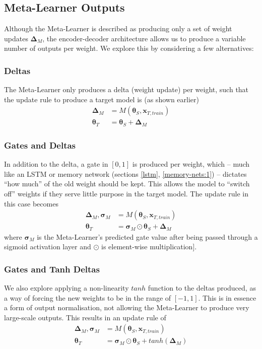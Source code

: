 \documentclass{report}
\begin{document}
\subsection{Meta-Learner Outputs}
Although the Meta-Learner is described as producing only a set of weight updates $\bm{\Delta}_M$, the encoder-decoder architecture allows us to produce a variable number of outputs per weight. We explore this by considering a few alternatives:

\subsubsection{Deltas}
The Meta-Learner only produces a delta (weight update) per weight, such that the update rule to produce a target model is (as shown earlier)
\begin{align}
\bm{\Delta}_M &= M(\bm{\theta}_S, \bm{x}_{T,train}) \\
\bm{\theta}_T &= \bm{\theta}_S + \bm{\Delta}_M \label{eqn-delta-updates}
\end{align}


\subsubsection{Gates and Deltas}
In addition to the delta, a gate in $[0, 1]$ is produced per weight, which -- much like an LSTM or memory network (sections \ref{lstm}, \ref{memory-nets:1}) -- dictates ``how much'' of the old weight should be kept. This allows the model to ``switch off'' weights if they serve little purpose in the target model. The update rule in this case becomes
\begin{align}
\bm{\Delta}_M, \bm{\sigma}_M &= M(\bm{\theta}_S, \bm{x}_{T,train}) \\
\bm{\theta}_T &= \bm{\sigma}_M \odot \bm{\theta}_S + \bm{\Delta}_M
\end{align}
where $\bm{\sigma}_M$ is the Meta-Learner's predicted gate value after being passed through a sigmoid activation layer and $\odot$ is element-wise multiplication].


\subsubsection{Gates and Tanh Deltas}
We also explore applying a non-linearity $tanh$ function to the deltas produced, as a way of forcing the new weights to be in the range of $[-1, 1]$. This is in essence a form of output normalisation, not allowing the Meta-Learner to produce very large-scale outputs. This results in an update rule of
\begin{align}
\bm{\Delta}_M, \bm{\sigma}_M &= M(\bm{\theta}_S, \bm{x}_{T,train}) \\
\bm{\theta}_T &= \bm{\sigma}_M \odot \bm{\theta}_S + tanh(\bm{\Delta}_M)
\end{align}
\end{document}
